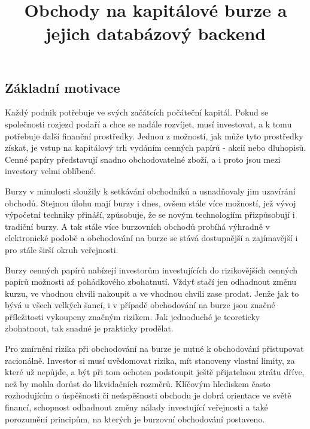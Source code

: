 \documentclass[thesis=M,czech]{FITthesis}[2012/06/26]
\title{Obchody na kapitálové burze a jejich databázový backend}
\begin{document}



\begin{introduction}

\section{Základní motivace}

Každý podnik potřebuje ve svých začátcích počáteční kapitál. Pokud se společnosti rozjezd podaří a 
chce se nadále rozvíjet, musí investovat, a k tomu potřebuje další finanční prostředky. Jednou z možností, 
jak může tyto prostředky získat, je vstup na kapitálový trh vydáním cenných papírů - akcií nebo dluhopisů. 
Cenné papíry představují snadno obchodovatelné zboží, a i proto jsou mezi investory velmi oblíbené. 

Burzy v minulosti sloužily k setkávání obchodníků a usnadňovaly jim uzavírání obchodů. Stejnou úlohu 
mají burzy i dnes, ovšem stále více možností, jež vývoj výpočetní techniky přináší, způsobuje, že se 
novým technologiím přizpůsobují i tradiční burzy. A tak stále více burzovních obchodů probíhá výhradně 
v elektronické podobě a obchodování na burze se stává dostupnější a zajímavější i pro stále širší 
okruh veřejnosti.

Burzy cenných papírů nabízejí investorům investujících do rizikovějších cenných papírů možnosti až pohádkového 
zbohatnutí. Vždyť stačí jen odhadnout změnu kurzu, ve vhodnou chvíli nakoupit a ve vhodnou chvíli 
zase prodat. Jenže jak to bývá u všech velkých šancí, i v případě obchodování na burze jsou značné 
příležitosti vykoupeny značným rizikem. Jak jednoduché je teoreticky zbohatnout, tak snadné je 
prakticky prodělat.

Pro zmírnění rizika při obchodování na burze je nutné k obchodování přistupovat racionálně. 
Investor si musí uvědomovat rizika, mít stanoveny vlastní limity, za které už nepůjde, a být při tom 
ochoten podstoupit ještě přijatelnou ztrátu dříve, než by mohla dorůst do likvidačních rozměrů. 
Klíčovým hlediskem často rozhodujícím o úspěšnosti či neúspěšnosti obchodu je dobrá orientace 
ve světě financí, schopnost odhadnout změny nálady investující veřejnosti a také porozumění 
principům, na kterých je burzovní obchodování postaveno.



\end{introduction}
\end{document}
